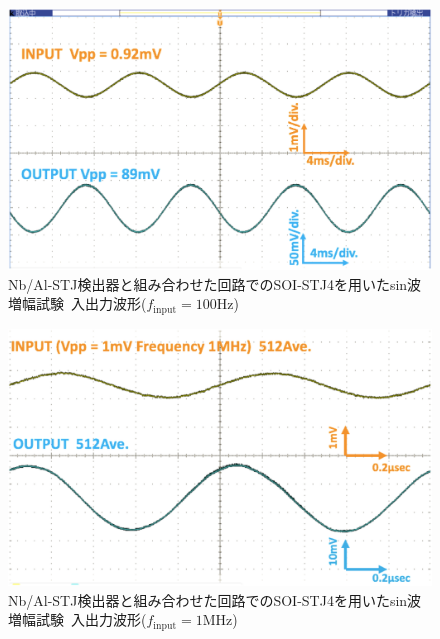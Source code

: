 			\begin{figure}[htbp]
				\begin{center}
					\includegraphics[width=12.0cm]{./Chapter/Chapter4/Picture/SOISTJ4wSTJ_InOut_100Hz.eps}
					\caption{Nb/Al-STJ検出器と組み合わせた回路でのSOI-STJ4を用いたsin波増幅試験\ 入出力波形($f_{\mathrm{input}}=100\mathrm{Hz}$)}
					\label{fig:SOISTJ4wSTJ_InOut_100Hz}
				\end{center}
			\end{figure}
			\begin{figure}[htbp]
				\begin{center}
					\includegraphics[width=12.0cm]{./Chapter/Chapter4/Picture/SOISTJ4wSTJ_InOut_1MHz.eps}
					\caption{Nb/Al-STJ検出器と組み合わせた回路でのSOI-STJ4を用いたsin波増幅試験\ 入出力波形($f_{\mathrm{input}}=1\mathrm{MHz}$)}
					\label{fig:SOISTJ4wSTJ_InOut_1MHz}
				\end{center}
			\end{figure}
